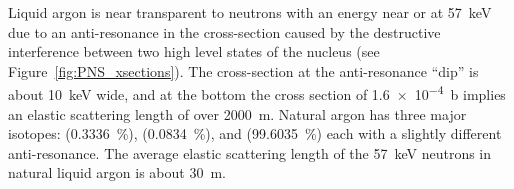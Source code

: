 



Liquid argon is near transparent to neutrons with an energy near or at \SI{57}{\keV} due to an anti-resonance in the cross-section caused by the destructive interference between two high level states of the  nucleus (see Figure~\ref{fig:PNS_xsections}). The cross-section at the anti-resonance ``dip'' is about \SI{10}{\keV} wide, and at the bottom the cross section of \SI{1.6e-4}{\barn} implies an elastic scattering length of over \SI{2000}{\m}. %
Natural argon has three major isotopes:  (\SI{0.3336}{\%}),  (\SI{0.0834}{\%}), and  (\SI{99.6035}{\%}) each with a slightly different anti-resonance. The average elastic scattering length of the \SI{57}{\keV} neutrons in natural liquid argon is about \SI{30}{\m}.

